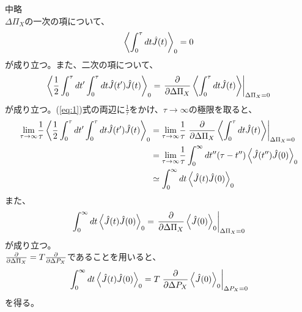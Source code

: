 \documentclass[a4paper,11pt]{jsarticle}
\begin{document}
中略\\%
$\Delta \Pi_X$の一次の項について、
\begin{align}
    \ev{\int_{0}^{\tau} dt \hat{J}(t)}_0 =0
\end{align}
が成り立つ。また、二次の項について、
\begin{equation}
    \label{eq:1}
    \ev{\frac{1}{2}\int_{0}^{\tau} dt' \int_{0}^{\tau} dt \hat{J}(t')\hat{J}(t)}_0 = \left. \pdv{\Delta \Pi_X} \ev{\int_{0}^{\tau} dt \hat{J}(t)}\right|_{\Delta \Pi_X = 0}
\end{equation}
が成り立つ。(\ref{eq:1})式の両辺に$\frac{1}{\tau}$をかけ、$\tau \to \infty$の極限を取ると、
\begin{align}
    \underset{\tau \to \infty}{\text{lim}} \frac{1}{\tau} \ev{\frac{1}{2}\int_{0}^{\tau} dt' \int_{0}^{\tau} dt \hat{J}(t')\hat{J}(t)}_0 
    &=\underset{\tau \to \infty}{\text{lim}} \frac{1}{\tau} \left.\pdv{\Delta \Pi_X} \ev{\int_{0}^{\tau} dt \hat{J}(t)}\right|_{\Delta \Pi_X = 0}\\
    &=\underset{\tau \to \infty}{\text{lim}} \frac{1}{\tau} \int_{0}^{\infty} dt''(\tau - t'')\ev{\hat{J}(t'')\hat{J}(0)}_0\\
    &\simeq \int_{0}^{\infty} dt \ev{\hat{J}(t)\hat{J}(0)}_0
\end{align}
また、%
\begin{equation}
    \int_{0}^{\infty} dt \ev{\hat{J}(t)\hat{J}(0)}_0 = \left.\pdv{\Delta \Pi_X} \ev{\hat{J}(0)}_0\right|_{\Delta \Pi_X = 0}
\end{equation}
が成り立つ。\\
$\pdv{\Delta \Pi_X} =T\pdv{\Delta P_X}$であることを用いると、
\begin{equation}
    \int_{0}^{\infty} dt \ev{\hat{J}(t)\hat{J}(0)}_0 = T\left.\pdv{\Delta P_X} \ev{\hat{J}(0)}_0\right|_{\Delta P_X = 0}
\end{equation}
を得る。\hfill \qedsymbol
\end{document}
